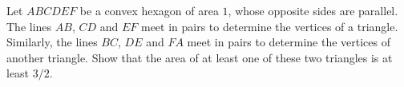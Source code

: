 Let $ABCDEF$ be a convex hexagon of area $1$,  whose opposite sides are parallel. The lines $AB$,  $CD$ and $EF$ meet in pairs to determine the vertices of a triangle. Similarly, the lines $BC$,  $DE$ and $FA$ meet in pairs to determine the vertices of another triangle. Show that the area of at least one of these two triangles is at least $3/2$.